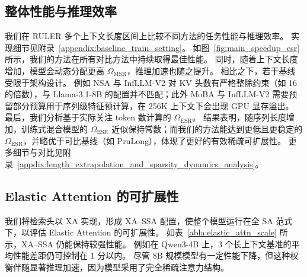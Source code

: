 \subsection{整体性能与推理效率}
\label{abaa:esr_speedup}
我们在 RULER 多个上下文长度区间上比较不同方法的任务性能与推理效率。
实现细节见附录~\ref{appendix:baseline_train_setting}。
如图~\ref{fig:main_speedup_esr} 所示，我们的方法在所有对比方法中持续取得最佳性能。
同时，随着上下文长度增加，模型会动态分配更高 $\Omega_\mathrm{MSR}$，推理加速也随之提升。
相比之下，若干基线受限于架构设计。
例如 NSA 与 InfLLM-V2 对 KV 头数有严格整除约束（如 16 的倍数），与 Llama-3.1-8B 的配置并不匹配；此外 MoBA 与 InfLLM-V2 需要预留部分预算用于序列级特征预计算，在 256K 上下文下会出现 GPU 显存溢出。
最后，我们分析基于实际关注 token 数计算的 $\Omega_{\mathrm{ESR}}$。
结果表明，随序列长度增加，训练式混合模型的 $\Omega_{\mathrm{ESR}}$ 近似保持常数；而我们的方法能达到更低且更稳定的 $\Omega_{\mathrm{ESR}}$，并略优于可比基线（如 PruLong），体现了更好的有效稀疏可扩展性。
更多细节与对比见附录~\ref{appdix:length_extrapolation_and_sparsity_dynamics_analysis}。


\subsection{Elastic Attention 的可扩展性}
\label{abla:ela_attn_scale}
我们将检索头以 XA 实现，形成 XA–SSA 配置，使整个模型运行在全 SA 范式下，以评估 Elastic Attention 的可扩展性。
如表~\ref{abla:elastic_attn_scale} 所示，XA–SSA 仍能保持较强性能。
例如在 Qwen3-4B 上，3 个长上下文基准的平均性能差距仍可控制在 1 分以内。
尽管 8B 规模模型有一定性能下降，但这种权衡伴随显著推理加速，因为模型采用了完全稀疏注意力结构。







